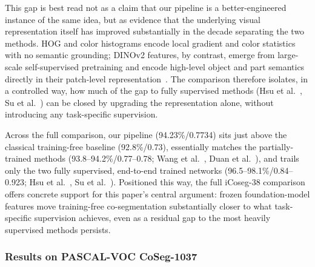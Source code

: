 This gap is best read not as a claim that our pipeline is a better-engineered instance of the same idea, but as evidence that the underlying visual representation itself has improved substantially in the decade separating the two methods. HOG and color histograms encode local gradient and color statistics with no semantic grounding; DINOv2 features, by contrast, emerge from large-scale self-supervised pretraining and encode high-level object and part semantics directly in their patch-level representation~\cite{oquab2024dinov2}. The comparison therefore isolates, in a controlled way, how much of the gap to fully supervised methods (Hsu et al.~\cite{hsu2018}, Su et al.~\cite{su2024ufgs}) can be closed by upgrading the representation alone, without introducing any task-specific supervision.

Across the full comparison, our pipeline (94.23\%/0.7734) sits just above the classical training-free baseline (92.8\%/0.73), essentially matches the partially-trained methods (93.8--94.2\%/0.77--0.78; Wang et al.~\cite{wang2017nparitite}, Duan et al.~\cite{duan2022rlcoseg}), and trails only the two fully supervised, end-to-end trained networks (96.5--98.1\%/0.84--0.923; Hsu et al.~\cite{hsu2018}, Su et al.~\cite{su2024ufgs}). Positioned this way, the full iCoseg-38 comparison offers concrete support for this paper's central argument: frozen foundation-model features move training-free co-segmentation substantially closer to what task-specific supervision achieves, even as a residual gap to the most heavily supervised methods persists.

\subsubsection{Results on PASCAL-VOC CoSeg-1037}
\label{sec:results-pascal}

